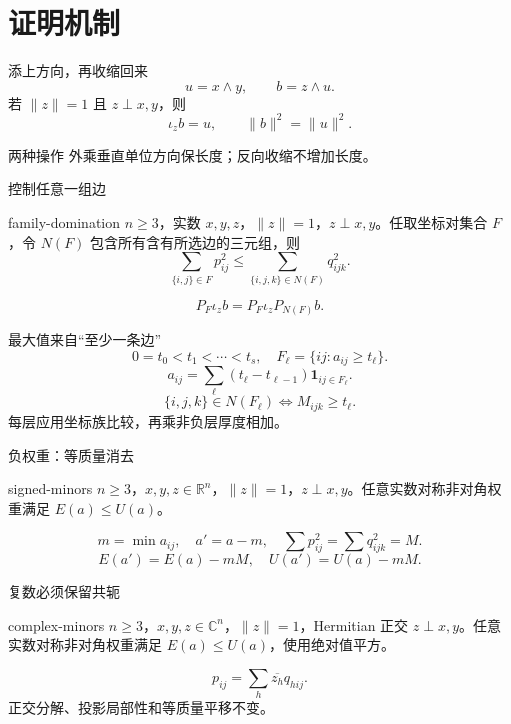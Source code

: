 \documentclass{beamer}
\begin{document}
\section{证明机制}
\begin{frame}{添上方向，再收缩回来}
\[
u=x\wedge y,\qquad b=z\wedge u.
\]
若 $\|z\|=1$ 且 $z\perp x,y$，则
\[
\iota_z b=u,\qquad \|b\|^2=\|u\|^2.
\]
\begin{block}{两种操作}
外乘垂直单位方向保长度；反向收缩不增加长度。
\end{block}
\end{frame}
\begin{frame}{控制任意一组边}
\begin{bookresult}{family-domination}
$n\ge3$，实数 $x,y,z$，$\|z\|=1$，$z\perp x,y$。任取坐标对集合 $F$，令 $N(F)$ 包含所有含有所选边的三元组，则
\[
\sum_{\{i,j\}\in F}p_{ij}^2
\le\sum_{\{i,j,k\}\in N(F)}q_{ijk}^2.
\]
\end{bookresult}
\[
P_F\iota_zb=P_F\iota_zP_{N(F)}b.
\]
\end{frame}
\begin{frame}{最大值来自“至少一条边”}
\[
0=t_0<t_1<\cdots<t_s,\quad F_\ell=\{ij:a_{ij}\ge t_\ell\}.
\]
\[
a_{ij}=\sum_\ell(t_\ell-t_{\ell-1})\mathbf1_{ij\in F_\ell}.
\]
\[
\{i,j,k\}\in N(F_\ell)\iff M_{ijk}\ge t_\ell.
\]
每层应用坐标族比较，再乘非负层厚度相加。
\end{frame}
\begin{frame}{负权重：等质量消去}
\begin{bookresult}{signed-minors}
$n\ge3$，$x,y,z\in\mathbb R^n$，$\|z\|=1$，$z\perp x,y$。任意实数对称非对角权重满足 $E(a)\le U(a)$。
\end{bookresult}
\[
m=\min a_{ij},\quad a'=a-m,\quad
\sum p_{ij}^2=\sum q_{ijk}^2=M.
\]
\[
E(a')=E(a)-mM,\quad U(a')=U(a)-mM.
\]
\end{frame}
\begin{frame}{复数必须保留共轭}
\begin{bookresult}{complex-minors}
$n\ge3$，$x,y,z\in\mathbb C^n$，$\|z\|=1$，Hermitian 正交 $z\perp x,y$。任意实数对称非对角权重满足 $E(a)\le U(a)$，使用绝对值平方。
\end{bookresult}
\[
p_{ij}=\sum_h\overline{z_h}q_{hij}.
\]
\small 正交分解、投影局部性和等质量平移不变。
\end{frame}
\end{document}
